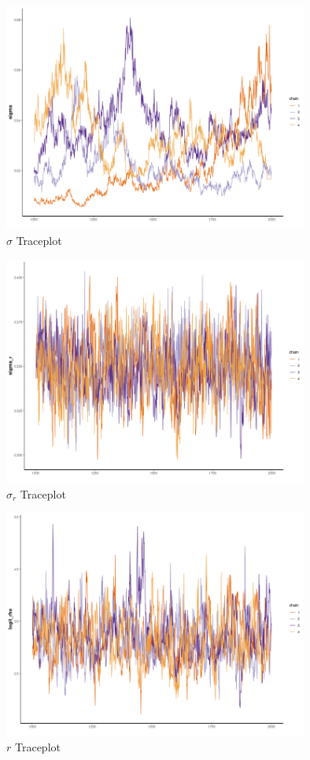 \documentclass[11pt]{article}
\begin{document}
\begin{figure}[h!] 
	\centering
  \includegraphics[height=75mm]{traceplot_sigma.png}
  \caption{$\sigma$ Traceplot}
  \label{fig:tsigma}
\end{figure}

\begin{figure}[h!] 
	\centering
  \includegraphics[height=75mm]{traceplot_sigma_r.png}
  \caption{$\sigma_r$ Traceplot}
  \label{fig:tsigma_r}
\end{figure}

\begin{figure}[h!] 
	\centering
  \includegraphics[height=75mm]{traceplot_logit_rho.png}
  \caption{$r$ Traceplot}
  \label{fig:tlogit_rho}
\end{figure}
\end{document}
